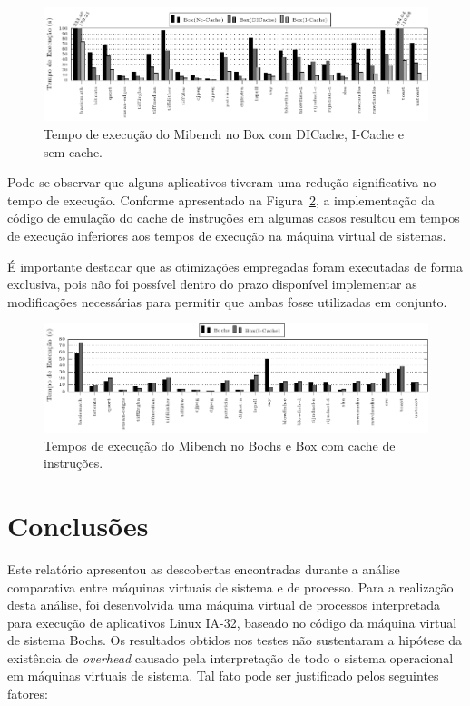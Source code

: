 \documentclass[11pt,twoside]{article}
\begin{document}
\begin{figure}[h]
	\centering
	\includegraphics[width=1.0\textwidth]{figures/dicache_nocache}
	\caption{Tempo de execução do Mibench no Box com DICache, I-Cache e sem cache.}
	\label{fig:dicache_nocache}
\end{figure}

Pode-se observar que alguns aplicativos tiveram uma redução significativa no
tempo de execução. Conforme apresentado na Figura~\ref{fig:bochs_icache}, a
implementação da código de emulação do cache de instruções em algumas casos
resultou em tempos de execução inferiores aos tempos de execução na máquina
virtual de sistemas.

É importante destacar que as otimizações empregadas foram executadas de forma
exclusiva, pois não foi possível dentro do prazo disponível implementar as
modificações necessárias para permitir que ambas fosse utilizadas em conjunto.

\begin{figure}[h]
        \centering
        \includegraphics[width=1.0\textwidth]{figures/bochs_icache}
        \caption{Tempos de execução do Mibench no Bochs e Box com cache de instruções.}
        \label{fig:bochs_icache}
\end{figure}

\section{Conclusões} \label{sec:conclusao}

Este relatório apresentou as descobertas encontradas durante a análise
comparativa entre máquinas virtuais de sistema e de processo.  Para a realização
desta análise, foi desenvolvida uma máquina virtual de processos interpretada
para execução de aplicativos Linux IA-32, baseado no código da máquina virtual
de sistema Bochs.  
Os resultados obtidos nos testes não sustentaram a hipótese da
existência de \emph{overhead} causado pela interpretação de todo o sistema operacional
em máquinas virtuais de sistema. Tal fato pode ser justificado pelos seguintes
fatores:
\end{document}
